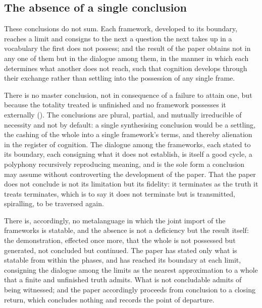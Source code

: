 \subsection{The absence of a single conclusion}
\label{p10:sec:no-conclusion}

These conclusions do not sum. Each framework, developed to its boundary, reaches a limit and consigns to the next a question the next takes up in a vocabulary the first does not possess; and the result of the paper obtains not in any one of them but in the dialogue among them, in the manner in which each determines what another does not reach, such that cognition develops through their exchange rather than settling into the possession of any single frame.

\begin{claim}
There is no master conclusion, not in consequence of a failure to attain one, but because the totality treated is unfinished and no framework possesses it externally (). The conclusions are plural, partial, and mutually irreducible of necessity and not by default: a single synthesising conclusion would be a settling, the cashing of the whole into a single framework's terms, and thereby alienation in the register of cognition. The dialogue among the frameworks, each stated to its boundary, each consigning what it does not establish, is itself a good cycle, a polyphony recursively reproducing meaning, and is the sole form a conclusion may assume without controverting the development of the paper. That the paper does not conclude is not its limitation but its fidelity: it terminates as the truth it treats terminates, which is to say it does not terminate but is transmitted, spiralling, to be traversed again.
\end{claim}

\noindent
There is, accordingly, no metalanguage in which the joint import of the frameworks is statable, and the absence is not a deficiency but the result itself: the demonstration, effected once more, that the whole is not possessed but generated, not concluded but continued. The paper has stated only what is statable from within the phases, and has reached its boundary at each limit, consigning the dialogue among the limits as the nearest approximation to a whole that a finite and unfinished truth admits. What is not concludable admits of being witnessed; and the paper accordingly proceeds from conclusion to a closing return, which concludes nothing and records the point of departure.
